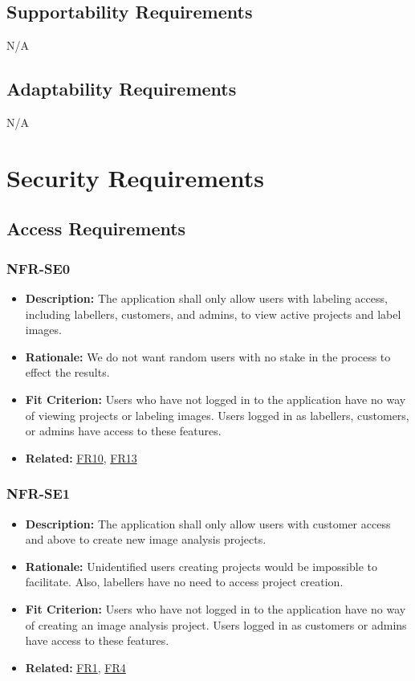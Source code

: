 \documentclass[12pt]{article}
\begin{document}
\subsection{Supportability Requirements}
N/A
\subsection{Adaptability Requirements}
N/A

\section{Security Requirements}
\subsection{Access Requirements}
\subsubsection*{NFR-SE0}
\label{sec:SE0}
\begin{itemize}
  \item \textbf{Description:} The application shall only allow users with labeling access, including labellers, customers, and admins, to view active projects and label images.
  \item \textbf{Rationale:} We do not want random users with no stake in the process to effect the results.
  \item \textbf{Fit Criterion:} Users who have not logged in to the application have no way of viewing projects or labeling images. Users logged in as labellers, customers, or admins have access to these features.
  \item \textbf{Related:} \hyperref[sec:FR10]{FR10}, \hyperref[sec:FR13]{FR13}
\end{itemize}
\subsubsection*{NFR-SE1}
\label{sec:SE1}
\begin{itemize}
  \item \textbf{Description:} The application shall only allow users with customer access and above to create new image analysis projects.
  \item \textbf{Rationale:} Unidentified users creating projects would be impossible to facilitate. Also, labellers have no need to access project creation. 
  \item \textbf{Fit Criterion:} Users who have not logged in to the application have no way of creating an image analysis project. Users logged in as customers or admins have access to these features.
  \item \textbf{Related:} \hyperref[sec:FR1]{FR1}, \hyperref[sec:FR4]{FR4}
\end{itemize}
\end{document}
